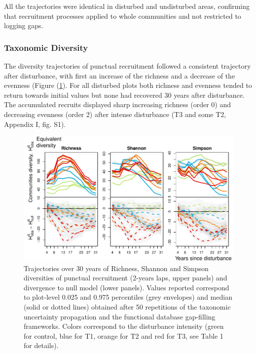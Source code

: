 \documentclass[fleqn,10pt]{ArtEcoFoG} %
\begin{document}
All the trajectories were identical in disturbed and undisturbed areas,
confirming that recruitment processes applied to whole communities and
not restricted to logging gaps.

\subsubsection{Taxonomic Diversity}\label{taxonomic-diversity}

The diversity trajectories of punctual recruitment followed a consistent
trajectory after disturbance, with first an increase of the richness and
a decrease of the evenness (Figure (\ref{fig:DivTraj}). For all
disturbed plots both richness and evenness tended to return towards
initial values but none had recovered 30 years after disturbance. The
accumulated recruits displayed sharp increasing richness (order 0) and
decreasing evenness (order 2) after intense disturbance (T3 and some T2,
Appendix I, fig. S1).

\begin{figure}

{\centering \includegraphics[width=0.8\linewidth]{RecruitmentTrajectories_files/figure-latex/DivTraj-1} 

}

\caption{Trajectories over 30 years of Richness, Shannon and Simpson diversities of punctual  recruitment (2-years laps, upper panels) and divergence to null model (lower panels). Values reported correspond to plot-level 0.025 and 0.975 percentiles (grey envelopes) and median (solid or dotted lines) obtained after 50 repetitions of the taxonomic uncertainty propagation and the functional database gap-filling frameworks. Colors correspond to the disturbance intensity (green for control, blue for T1, orange for T2 and red for T3, see Table 1 for details).}\label{fig:DivTraj}
\end{figure}
\end{document}
